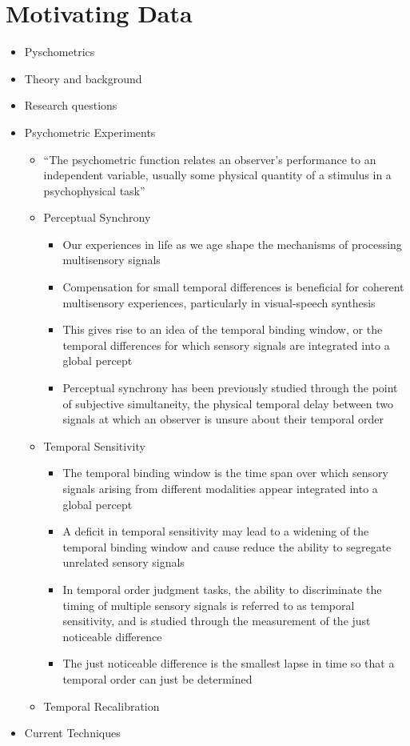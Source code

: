 \documentclass[
]{article}
\providecommand{\tightlist}{%
  \setlength{\itemsep}{0pt}\setlength{\parskip}{0pt}}
\begin{document}
\hypertarget{motivating-data}{%
\section{Motivating Data}\label{motivating-data}}

\begin{itemize}
\item
  Pyschometrics
\item
  Theory and background
\item
  Research questions
\item
  Psychometric Experiments

  \begin{itemize}
  \tightlist
  \item
    ``The psychometric function relates an observer's performance to an independent variable, usually some physical quantity of a stimulus in a psychophysical task'' \citep{wichmann2001a}
  \item
    Perceptual Synchrony

    \begin{itemize}
    \tightlist
    \item
      Our experiences in life as we age shape the mechanisms of processing multisensory signals
    \item
      Compensation for small temporal differences is beneficial for coherent multisensory experiences, particularly in visual-speech synthesis
    \item
      This gives rise to an idea of the temporal binding window, or the temporal differences for which sensory signals are integrated into a global percept
    \item
      Perceptual synchrony has been previously studied through the point of subjective simultaneity, the physical temporal delay between two signals at which an observer is unsure about their temporal order \citep{stone2001now}
    \end{itemize}
  \item
    Temporal Sensitivity

    \begin{itemize}
    \tightlist
    \item
      The temporal binding window is the time span over which sensory signals arising from different modalities appear integrated into a global percept
    \item
      A deficit in temporal sensitivity may lead to a widening of the temporal binding window and cause reduce the ability to segregate unrelated sensory signals
    \item
      In temporal order judgment tasks, the ability to discriminate the timing of multiple sensory signals is referred to as temporal sensitivity, and is studied through the measurement of the just noticeable difference
    \item
      The just noticeable difference is the smallest lapse in time so that a temporal order can just be determined
    \end{itemize}
  \item
    Temporal Recalibration
  \end{itemize}
\item
  Current Techniques


\end{itemize}
\end{document}
